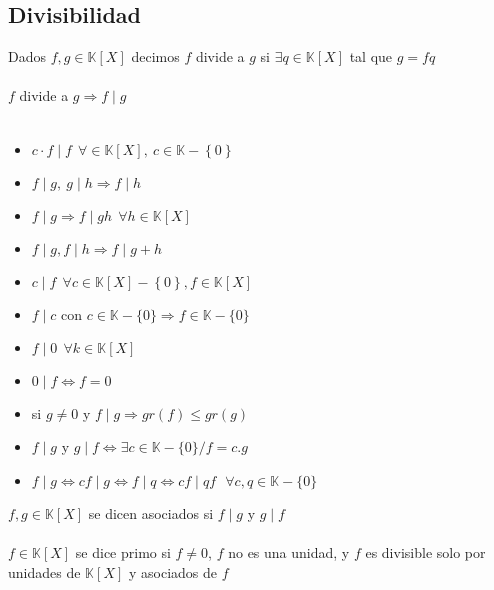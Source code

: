 \documentclass[a4paper,10pt]{article}
\begin{document}
\subsection{Divisibilidad}


 Dados $f,g \in \mathbb{K}[X]$ decimos $f$ divide a $g$ si $\exists q \in \mathbb{K}[X]$ tal que $g = fq$ \\ \\

\notacion $f$ divide a $g \Rightarrow f \mid g$ \\ \\

\propiedades
\begin{itemize}
	\item $c \cdot f \mid f \ \ \forall \in \mathbb{K}[X], \ c \in \mathbb{K}-\left\lbrace 0 \right\rbrace$
	\item $f \mid g, \ g \mid h \Rightarrow f \mid h$
	\item $f \mid g \Rightarrow f \mid gh \ \ \forall h \in \mathbb{K}[X]$
	\item $f \mid g, f \mid h \Rightarrow f \mid g + h$
	\item $c \mid f \ \ \forall c \in \mathbb{K}[X] - \left\lbrace 0 \right\rbrace, f \in \mathbb{K}[X]$
	\item $f \mid c \mbox{ con } c \in \mathbb{K} - \{0\} \Rightarrow f \in \mathbb{K}-\{0\}$
	\item $f \mid 0 \ \ \forall k \in \mathbb{K}[X]$
	\item $0 \mid f \Leftrightarrow f = 0$
	\item si $g \neq 0$ y $f \mid g \Rightarrow gr(f) \leq gr(g)$ 
	\item $f \mid g$ y $g \mid f \Leftrightarrow \exists c \in \mathbb{K} - \{0\} / f = c.g$
	\item $f \mid g \Leftrightarrow cf \mid g \Leftrightarrow f \mid q \Leftrightarrow cf \mid qf \ \ \ \forall c,q \in \mathbb{K}-\{0\}$
\end{itemize}

 $f,g \in \mathbb{K}[X]$ se dicen asociados si $f \mid g$ y $g \mid f$ \\ \\

 $f \in \mathbb{K}[X]$ se dice primo si $f \neq 0$, $f$ no es una unidad, y $f$ es divisible solo por unidades de $\mathbb{K}[X]$ y asociados de $f$ \\ \\
\end{document}
